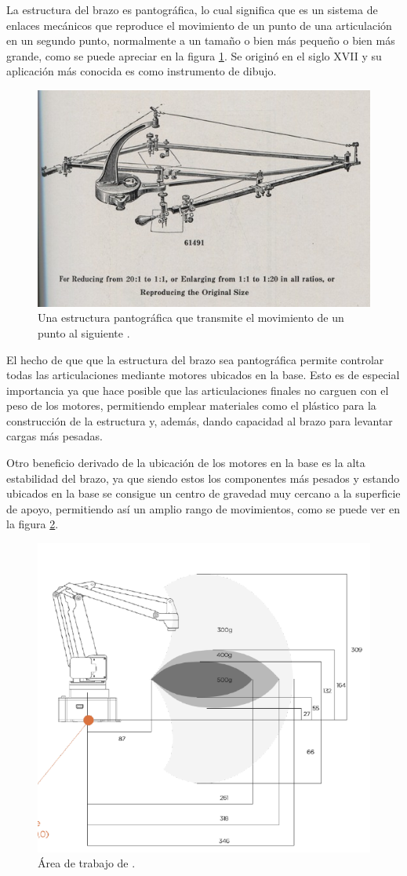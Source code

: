 La estructura del brazo es pantográfica, lo cual significa que es un sistema de enlaces mecánicos que reproduce el movimiento de un punto de una articulación en un segundo punto, normalmente a un tamaño o bien más pequeño o bien más grande, como se puede apreciar en la figura \ref{fig:estrucutra_pantografica}. Se originó en el siglo XVII y su aplicación más conocida es como instrumento de dibujo.

\begin{figure}[H]
    \centering
    \includegraphics[width=.7\linewidth]{pictures/link-to-elliott-p149-suspended-pantograph-sf0.jpg}
    \caption{Una estructura pantográfica que transmite el movimiento de un punto al siguiente \cite{noauthor_pantograph_nodate}.}
    \label{fig:estrucutra_pantografica}
\end{figure}

El hecho de que que la estructura del brazo sea pantográfica permite controlar todas las articulaciones mediante motores ubicados en la base. Esto es de especial importancia ya que hace posible que las articulaciones finales no carguen con el peso de los motores, permitiendo emplear materiales como el plástico para la construcción de la estructura y, además, dando capacidad al brazo para levantar cargas más pesadas.

Otro beneficio derivado de la ubicación de los motores en la base es la alta estabilidad del brazo, ya que siendo estos los componentes más pesados y estando ubicados en la base se consigue un centro de gravedad muy cercano a la superficie de apoyo, permitiendo así un amplio rango de movimientos, como se puede ver en la figura \ref{fig:pArm_working_area}.

\begin{figure}[H]
    \centering
    \includegraphics[width=.6\linewidth]{pictures/arm_weights_distances.png}
    \caption{Área de trabajo de \pArm{} \cite{noauthor_ufactory_nodate}.}
    \label{fig:pArm_working_area}
\end{figure}

